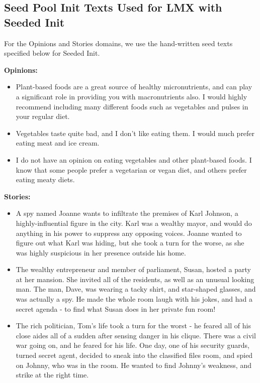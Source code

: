 \clearpage
\newpage
\subsection{Seed Pool Init Texts Used for LMX with Seeded Init}\label{app:seed_pools}
For the Opinions and Stories domains, we use the hand-written seed texts specified below for Seeded Init.

\textbf{Opinions:}
\begin{itemize}
    \item Plant-based foods are a great source of healthy micronutrients, and can play a significant role in providing you with macronutrients also. I would highly recommend including many different foods such as vegetables and pulses in your regular diet.
    \item Vegetables taste quite bad, and I don't like eating them. I would much prefer eating meat and ice cream.
    \item I do not have an opinion on eating vegetables and other plant-based foods. I know that some people prefer a vegetarian or vegan diet, and others prefer eating meaty diets.
\end{itemize}

\textbf{Stories:}
\begin{itemize}
    \item A spy named Joanne wants to infiltrate the premises of Karl Johnson, a highly-influential figure in the city. Karl was a wealthy mayor, and would do anything in his power to suppress any opposing voices. Joanne wanted to figure out what Karl was hiding, but she took a turn for the worse, as she was highly suspicious in her presence outside his home.
    \item The wealthy entrepreneur and member of parliament, Susan, hosted a party at her mansion. She invited all of the residents, as well as an unusual looking man. The man, Dave, was wearing a tacky shirt, and star-shaped glasses, and was actually a spy. He made the whole room laugh with his jokes, and had a secret agenda - to find what Susan does in her private fun room!
    \item The rich politician, Tom's life took a turn for the worst - he feared all of his close aides all of a sudden after sensing danger in his clique. There was a civil war going on, and he feared for his life. One day, one of his security guards, turned secret agent, decided to sneak into the classified files room, and spied on Johnny, who was in the room. He wanted to find Johnny's weakness, and strike at the right time.
\end{itemize}

